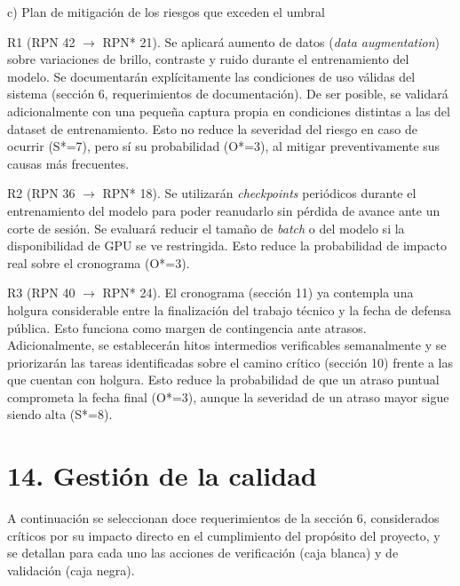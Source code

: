 \documentclass[
11pt, %
]{charter}
\begin{document}
	c) Plan de mitigación de los riesgos que exceden el umbral
	
	R1 (RPN 42 $\rightarrow$ RPN* 21). Se aplicará aumento de datos (\textit{data augmentation}) sobre variaciones de brillo, contraste y ruido durante el entrenamiento del modelo. Se documentarán explícitamente las condiciones de uso válidas del sistema (sección 6, requerimientos de documentación). De ser posible, se validará adicionalmente con una pequeña captura propia en condiciones distintas a las del dataset de entrenamiento. Esto no reduce la severidad del riesgo en caso de ocurrir (S*=7), pero sí su probabilidad (O*=3), al mitigar preventivamente sus causas más frecuentes.
	
	R2 (RPN 36 $\rightarrow$ RPN* 18). Se utilizarán \textit{checkpoints} periódicos durante el entrenamiento del modelo para poder reanudarlo sin pérdida de avance ante un corte de sesión. Se evaluará reducir el tamaño de \textit{batch} o del modelo si la disponibilidad de GPU se ve restringida. Esto reduce la probabilidad de impacto real sobre el cronograma (O*=3).
	
	R3 (RPN 40 $\rightarrow$ RPN* 24). El cronograma (sección 11) ya contempla una holgura considerable entre la finalización del trabajo técnico y la fecha de defensa pública. Esto funciona como margen de contingencia ante atrasos. Adicionalmente, se establecerán hitos intermedios verificables semanalmente y se priorizarán las tareas identificadas sobre el camino crítico (sección 10) frente a las que cuentan con holgura. Esto reduce la probabilidad de que un atraso puntual comprometa la fecha final (O*=3), aunque la severidad de un atraso mayor sigue siendo alta (S*=8).
	
	
	\section{14. Gestión de la calidad}
	\label{sec:calidad}
	
	A continuación se seleccionan doce requerimientos de la sección 6, considerados críticos por su impacto directo en el cumplimiento del propósito del proyecto, y se detallan para cada uno las acciones de verificación (caja blanca) y de validación (caja negra).
	
\end{document}
